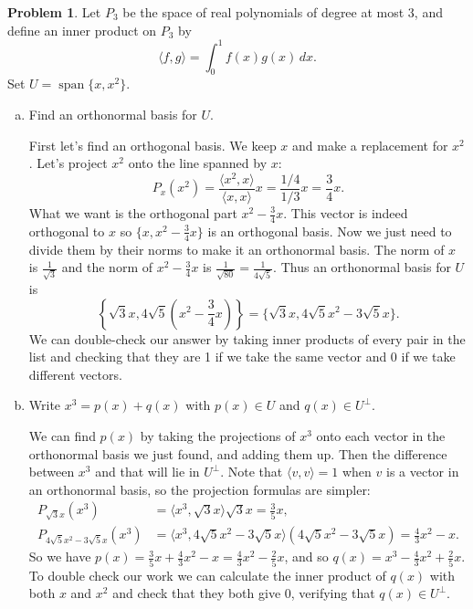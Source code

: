 \documentclass[11pt,oneside]{amsart}
\theoremstyle{definition}
\newtheorem{problem}{Problem}
\DeclareMathOperator{\Span}{span}
\begin{document}
    \begin{problem}
        Let $P_3$ be the space of real polynomials of degree at most 3, and define an inner product on $P_3$ by
        \[\langle f,g\rangle=\int_0^1 f(x)g(x)\,dx.\]
        Set $U=\Span\{x,x^2\}$.
        \begin{enumerate}[(a)]
            \item Find an orthonormal basis for $U$.
            \begin{solution}
                First let's find an orthogonal basis. We keep $x$ and make a replacement for $x^2$. Let's project $x^2$ onto the line spanned by $x$:
                \[P_x(x^2)=\frac{\langle x^2,x\rangle}{\langle x,x\rangle}x=\frac{1/4}{1/3}x=\frac 34x.\]
                What we want is the orthogonal part $x^2-\frac 34x$. This vector is indeed orthogonal to $x$ so $\{x,x^2-\frac 34x\}$ is an orthogonal basis. Now we just need to divide them by their norms to make it an orthonormal basis. The norm of $x$ is $\frac 1{\sqrt3}$ and the norm of $x^2-\frac 34x$ is $\frac 1{\sqrt{80}}=\frac 1{4\sqrt 5}$. Thus an orthonormal basis for $U$ is
                \[\left\{\sqrt 3 x, 4\sqrt 5(x^2-\frac 34x)\right\}=\{\sqrt 3 x,4\sqrt 5 x^2-3\sqrt 5x\}.\]
                We can double-check our answer by taking inner products of every pair in the list and checking that they are 1 if we take the same vector and 0 if we take different vectors.
            \end{solution}
            \item Write $x^3=p(x)+q(x)$ with $p(x)\in U$ and $q(x)\in U^\perp$.
            \begin{solution}
                We can find $p(x)$ by taking the projections of $x^3$ onto each vector in the orthonormal basis we just found, and adding them up. Then the difference between $x^3$ and that will lie in $U^\perp$. Note that $\langle v,v\rangle=1$ when $v$ is a vector in an orthonormal basis, so the projection formulas are simpler:
                \begin{align*}
                    P_{\sqrt 3x}(x^3) &= \langle x^3,\sqrt3x\rangle\sqrt 3x=\frac 35 x,\\
                    P_{4\sqrt 5 x^2-3\sqrt 5x}(x^3) &= \langle x^3,4\sqrt 5 x^2-3\sqrt 5x\rangle (4\sqrt 5 x^2-3\sqrt 5x)=\frac 43x^2-x.
                \end{align*}
                So we have $p(x)=\frac 35x+\frac 43x^2-x=\frac 43x^2-\frac 25x$, and so $q(x)=x^3-\frac 43x^2+\frac 25x$. To double check our work we can calculate the inner product of $q(x)$ with both $x$ and $x^2$ and check that they both give 0, verifying that $q(x)\in U^\perp$.
            \end{solution}
        \end{enumerate}
    \end{problem}
\end{document}
